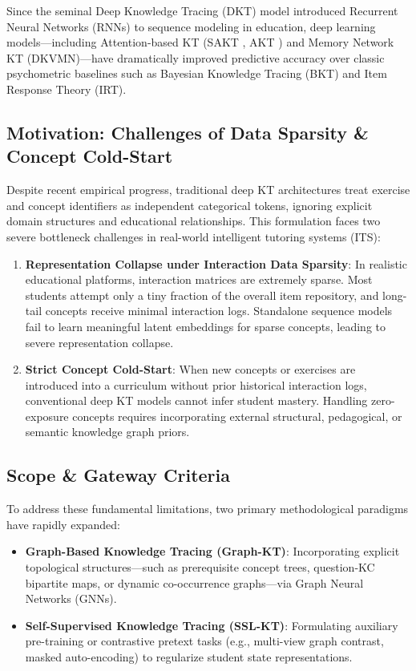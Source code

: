 \documentclass[10pt,journal,compsoc]{IEEEtran}
\begin{document}
Since the seminal Deep Knowledge Tracing (DKT) model \cite{Piech_DKT_2015} introduced Recurrent Neural Networks (RNNs) to sequence modeling in education, deep learning models---including Attention-based KT (SAKT \cite{Pandey_SAKT_2019}, AKT \cite{Ghosh_AKT_2020}) and Memory Network KT (DKVMN)---have dramatically improved predictive accuracy over classic psychometric baselines such as Bayesian Knowledge Tracing (BKT) and Item Response Theory (IRT).

\subsection{Motivation: Challenges of Data Sparsity \& Concept Cold-Start}
Despite recent empirical progress, traditional deep KT architectures treat exercise and concept identifiers as independent categorical tokens, ignoring explicit domain structures and educational relationships. This formulation faces two severe bottleneck challenges in real-world intelligent tutoring systems (ITS):
\begin{enumerate}
    \item \textbf{Representation Collapse under Interaction Data Sparsity}: In realistic educational platforms, interaction matrices are extremely sparse. Most students attempt only a tiny fraction of the overall item repository, and long-tail concepts receive minimal interaction logs. Standalone sequence models fail to learn meaningful latent embeddings for sparse concepts, leading to severe representation collapse.
    \item \textbf{Strict Concept Cold-Start}: When new concepts or exercises are introduced into a curriculum without prior historical interaction logs, conventional deep KT models cannot infer student mastery. Handling zero-exposure concepts requires incorporating external structural, pedagogical, or semantic knowledge graph priors.
\end{enumerate}

\subsection{Scope \& Gateway Criteria}
To address these fundamental limitations, two primary methodological paradigms have rapidly expanded:
\begin{itemize}
    \item \textbf{Graph-Based Knowledge Tracing (Graph-KT)}: Incorporating explicit topological structures---such as prerequisite concept trees, question-KC bipartite maps, or dynamic co-occurrence graphs---via Graph Neural Networks (GNNs).
    \item \textbf{Self-Supervised Knowledge Tracing (SSL-KT)}: Formulating auxiliary pre-training or contrastive pretext tasks (e.g., multi-view graph contrast, masked auto-encoding) to regularize student state representations.
\end{itemize}
\end{document}
